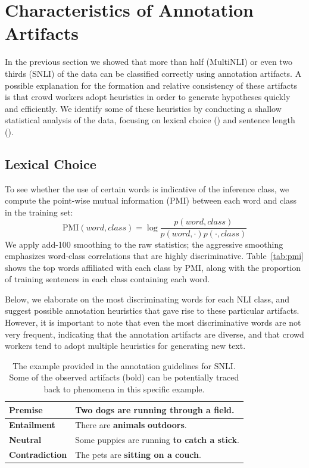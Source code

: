 \section{Characteristics of Annotation Artifacts}
\label{ssec:analysis}

In the previous section we showed that more than half (MultiNLI) or even two thirds (SNLI) of the data can be classified correctly using annotation artifacts.
A possible explanation for the formation and relative consistency of these artifacts is that crowd workers adopt  heuristics in order to generate hypotheses quickly and efficiently.
We identify some of these heuristics by conducting a shallow statistical analysis of the data, focusing on lexical choice () and sentence length ().


\subsection{Lexical Choice} 
\label{ssec:lexical}

To see whether the use of certain words is indicative of the inference class, we compute the point-wise mutual information (PMI) between each word and class in the training set:
\begin{equation*}
\text{PMI} (\textit{word}, \textit{class}) = \log \frac{p(\textit{word}, \textit{class})}{p(\textit{word}, \cdot) p(\cdot, \textit{class})}
\end{equation*}
We apply add-100 smoothing to the raw statistics; 
the aggressive smoothing emphasizes word-class correlations that are highly discriminative. 
Table~\ref{tab:pmi} shows the top words affiliated with each class by PMI, along with the proportion of training sentences in each class containing each word.

Below, we elaborate on the most discriminating words for each NLI class, and suggest possible annotation heuristics that gave rise to these particular artifacts.
However, it is important to note that even the most discriminative words are not very frequent, indicating that the annotation artifacts are diverse, and that crowd workers tend to adopt multiple heuristics for generating new text. 

\begin{table}[t]
\centering
{
\begin{tabular}{ll} \toprule
\textbf{Premise} & Two dogs are running through a field. \\\midrule
\textbf{Entailment} & There are \textbf{animals} \textbf{outdoors}. \\
\textbf{Neutral} & Some puppies are running \textbf{to catch a stick}. \\
\textbf{Contradiction} & The pets are \textbf{sitting on a couch}. \\\bottomrule
\end{tabular}
}
\caption{The example provided in the annotation guidelines for SNLI. 
Some of the observed artifacts (bold) can be potentially traced back to phenomena in this specific example.}
\label{tab:guidelines}
\end{table}

